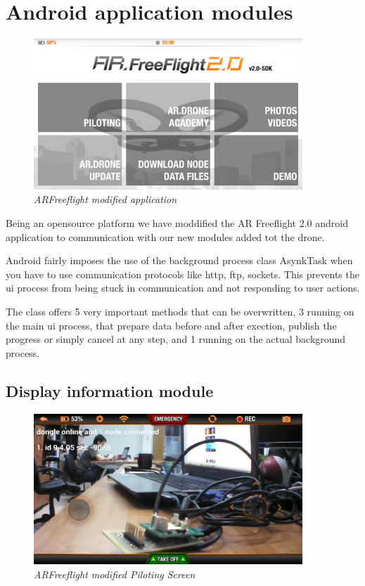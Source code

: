 \section{Android application modules}

\begin{figure}[ht]
\begin{center}
\includegraphics[width=0.9\textwidth]{implementation/android_app.png}
\end{center}
\caption{\small \itshape{ARFreeflight modified application}}
\end{figure}

Being an opensource platform we have moddified the AR Freeflight 2.0 android application to communication with our new modules added tot the drone.

Android fairly imposes the use of the background process class AsynkTask when you have to use communication protocols like http, ftp, sockets. This prevents the ui process from being stuck in communication and not responding to user actions. 

The class offers 5 very important methods that can be overwritten, 3 running on the main ui process, that prepare data before and after exection, publish  the progress or simply cancel at any step, and 1 running on the actual background process.


\subsection{Display information module}

\begin{figure}[ht]
\begin{center}
\includegraphics[width=0.9\textwidth]{implementation/android_info.png}
\end{center}
\caption{\small \itshape{ARFreeflight modified Piloting Screen}}
\end{figure}

